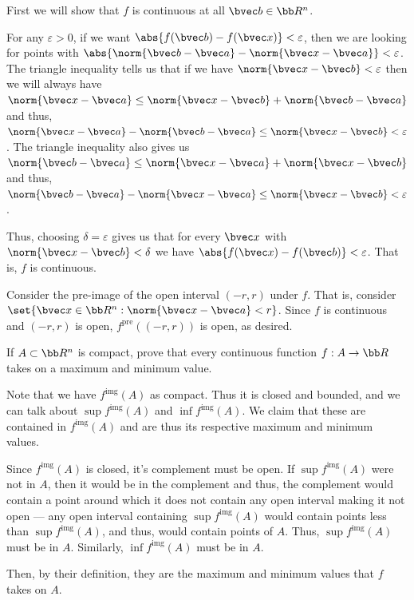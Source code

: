 \documentclass[12pt, letterpaper]{hmcpset}
\begin{document}
\begin{solution}
	First we will show that $f$ is continuous at all $\bvec b \in \bb R^n$.

	For any $\varepsilon > 0$, if we want $\abs{f(\bvec b) - f(\bvec x)} < \varepsilon$, then we are looking for points with $\abs{\norm{\bvec b - \bvec a} - \norm{\bvec x - \bvec a}} < \varepsilon$. The triangle inequality tells us that if we have $\norm{\bvec x - \bvec b} < \varepsilon$ then we will always have $\norm{\bvec x - \bvec a} \le \norm{\bvec x - \bvec b} + \norm{\bvec b - \bvec a}$ and thus, $\norm{\bvec x - \bvec a} - \norm{\bvec b - \bvec a} \le \norm{\bvec x - \bvec b} < \varepsilon$. The triangle inequality also gives us $\norm{\bvec b - \bvec a} \le \norm{\bvec x - \bvec a} + \norm{\bvec x - \bvec b}$ and thus, $\norm{\bvec b - \bvec a} - \norm{\bvec x - \bvec a} \le \norm{\bvec x - \bvec b} < \varepsilon$. 

	Thus, choosing $\delta = \varepsilon$ gives us that for every $\bvec x$ with $\norm{\bvec x - \bvec b} < \delta$ we have $\abs{f(\bvec x) - f(\bvec b)} < \varepsilon$. That is, $f$ is continuous.

	Consider the pre-image of the open interval $(-r, r)$ under $f$. That is, consider $\set{\bvec x \in \bb R^n : \norm{\bvec x - \bvec a} <r}$. Since $f$ is continuous and $(-r, r)$ is open, $f^\text{pre}((-r, r))$ is open, as desired.
\end{solution}

\pagebreak

\begin{problem}[29]
	If $A \subset \bb R^n$ is compact, prove that every continuous function $f : A \to \bb R$ takes on a maximum and minimum value.
\end{problem}

\begin{solution}
	Note that we have $f^{\text{img}}(A)$ as compact. Thus it is closed and bounded, and we can talk about $\sup f^{\text{img}}(A)$ and $\inf f^{\text{img}}(A)$. We claim that these are contained in $f^{\text{img}}(A)$ and are thus its respective maximum and minimum values.

	Since $f^{\text{img}}(A)$ is closed, it's complement must be open. If $\sup f^\text{img}(A)$ were not in $A$, then it would be in the complement and thus, the complement would contain a point around which it does not contain any open interval making it not open --- any open interval containing $\sup f^\text{img}(A)$ would contain points less than $\sup f^\text{img}(A)$, and thus, would contain points of $A$. Thus, $\sup f^\text{img}(A)$ must be in $A$. Similarly, $\inf f^\text{img}(A)$ must be in $A$.

	Then, by their definition, they are the maximum and minimum values that $f$ takes on $A$.
\end{solution}
\end{document}
